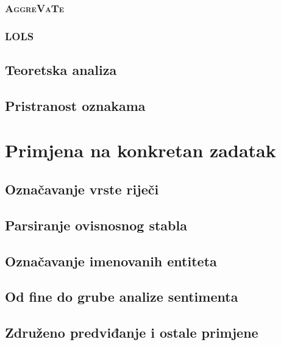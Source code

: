 \documentclass[times, utf8, diplomski]{fer}
\begin{document}
\subsection{\textsc{AggreVaTe}}

\subsection{\textsc{LOLS}}\label{ch:LOLS}


\section{Teoretska analiza}
\section{Pristranost oznakama}\label{ch:labelbias}


\chapter{Primjena na konkretan zadatak}\label{ch:applications}

\section{Označavanje vrste riječi}


\section{Parsiranje ovisnosnog stabla}


\section{Označavanje imenovanih entiteta}

\section{Od fine do grube analize sentimenta}

\section{Združeno predviđanje i ostale primjene}

\end{document}
